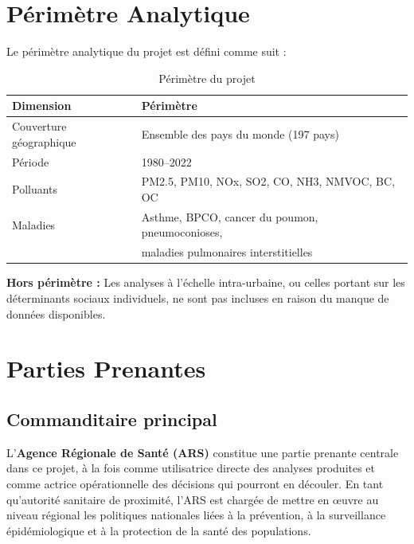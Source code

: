 \documentclass[11pt,a4paper]{article}
\begin{document}
\section{Périmètre Analytique}

Le périmètre analytique du projet est défini comme suit :

\begin{table}[H]
\centering
\caption{Périmètre du projet}
\begin{tabular}{ll}
\toprule
\textbf{Dimension} & \textbf{Périmètre} \\
\midrule
Couverture géographique & Ensemble des pays du monde (197 pays) \\
Période & 1980--2022 \\
Polluants & PM2.5, PM10, NOx, SO2, CO, NH3, NMVOC, BC, OC \\
Maladies & Asthme, BPCO, cancer du poumon, pneumoconioses, \\
& maladies pulmonaires interstitielles \\
\bottomrule
\end{tabular}
\end{table}

\textbf{Hors périmètre :} Les analyses à l'échelle intra-urbaine, ou celles portant sur les déterminants sociaux individuels, ne sont pas incluses en raison du manque de données disponibles.

\clearpage
\section{Parties Prenantes}

\subsection{Commanditaire principal}

L'\textbf{Agence Régionale de Santé (ARS)} constitue une partie prenante centrale dans ce projet, à la fois comme utilisatrice directe des analyses produites et comme actrice opérationnelle des décisions qui pourront en découler. En tant qu'autorité sanitaire de proximité, l'ARS est chargée de mettre en œuvre au niveau régional les politiques nationales liées à la prévention, à la surveillance épidémiologique et à la protection de la santé des populations.
\end{document}
